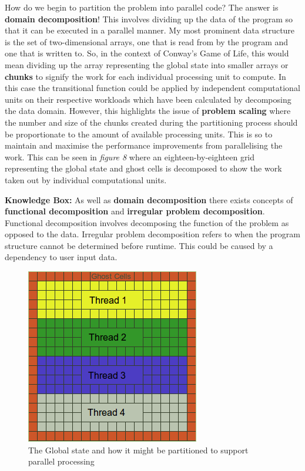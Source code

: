 \documentclass[11pt]{article} %
\begin{document}
How do we begin to partition the problem into parallel code? The answer is {\bf domain decomposition}! This involves dividing up the data of the program so that it can be executed in a parallel manner. My most prominent data structure is the set of two-dimensional arrays, one that is read from by the program and one that is written to. So, in the context of Conway's Game of Life, this would mean dividing up the array representing the global state into smaller arrays or {\bf chunks} to signify the work for each individual processing unit to compute. In this case the transitional function could be applied by independent computational units on their respective workloads which have been calculated by decomposing the data domain. However, this highlights the issue of {\bf problem scaling} where the number and size of the chunks created during the partitioning process should be proportionate to the amount of available processing units. This is so to maintain and maximise the performance improvements from parallelising the work. This can be seen in {\it figure 8} where an eighteen-by-eighteen grid representing the global state and ghost cells is decomposed to show the work taken out by individual computational units.
\bigskip
\begin{mdframed}
{\bf Knowledge Box:} As well as {\bf domain decomposition} there exists concepts of {\bf functional decomposition} and {\bf irregular problem decomposition}. Functional decomposition involves decomposing the function of the problem as opposed to the data. Irregular problem decomposition refers to when the program structure cannot be determined before runtime. This could be caused by a dependency to user input data.\cite[p85]{ref9}
\end{mdframed}
\begin{figure}[h]
\centering
\includegraphics[scale=0.7]{DomainDecomposition.png}
\caption{The Global state and how it might be partitioned to support parallel processing}
\label{fig: Para1}
\end{figure}
\end{document}
